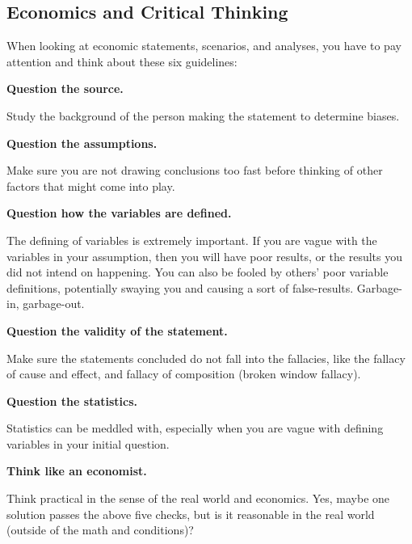 \documentclass[a4paper, 12pt] {article}
\begin{document}
\subsection{Economics and Critical Thinking}
When looking at economic statements, scenarios, and analyses, you have to pay
attention and think about these six guidelines:
\begin{compactenum}
    \item \textbf{Question the source.}
        
        Study the background of the person making the statement to determine
        biases.
    \item \textbf{Question the assumptions.}

        Make sure you are not drawing conclusions too fast before thinking of 
        other factors that might come into play.
    \item \textbf{Question how the variables are defined.}
        
        The defining of variables is extremely important. If you are vague with
        the variables in your assumption, then you will have poor results, or
        the results you did not intend on happening. You can also be fooled by
        others' poor variable definitions, potentially swaying you and causing
        a sort of false-results. Garbage-in, garbage-out.
    \item \textbf{Question the validity of the statement.}

        Make sure the statements concluded do not fall into the fallacies, like
        the fallacy of cause and effect, and fallacy of composition (broken window
        fallacy).
    \item \textbf{Question the statistics.}

        Statistics can be meddled with, especially when you are vague with
        defining variables in your initial question.
    \item \textbf{Think like an economist.}
        
        Think practical in the sense of the real world and economics. Yes, maybe
        one solution passes the above five checks, but is it reasonable in the
        real world (outside of the math and conditions)?
\end{compactenum}
\end{document}
